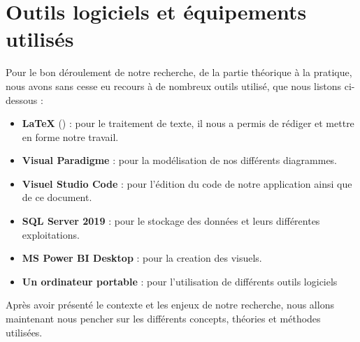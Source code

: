     \section[Outils logiciels et équipements utilisés]{Outils logiciels et équipements utilisés}
    Pour le bon déroulement de notre recherche, de la partie
    théorique à la pratique, nous avons sans cesse eu recours
    à de nombreux outils utilisé, que nous listons ci-dessous :
    \par
        \begin{itemize}
            \setlength{\itemsep}{0pt}
            \item [\ding{226}] \textbf{\LaTeX} () : pour le traitement de texte, il nous a permis de
            rédiger et mettre en forme notre travail.
            \item [\ding{226}] \textbf{Visual Paradigme} : pour la modélisation de nos
            différents diagrammes.
            \item [\ding{226}] \textbf{Visuel Studio Code} : pour l’édition du code de notre application ainsi que de ce document.
            \item [\ding{226}] \textbf{SQL Server 2019} : pour le stockage des données et leurs différentes exploitations.
            \item [\ding{226}] \textbf{MS Power BI Desktop} : pour la creation des visuels.
            \item [\ding{226}] \textbf{Un ordinateur portable} : pour l’utilisation de différents outils
            logiciels
        \end{itemize}
    Après avoir présenté le contexte et les enjeux de notre recherche, nous allons maintenant nous pencher sur
    les différents concepts, théories et méthodes utilisées.